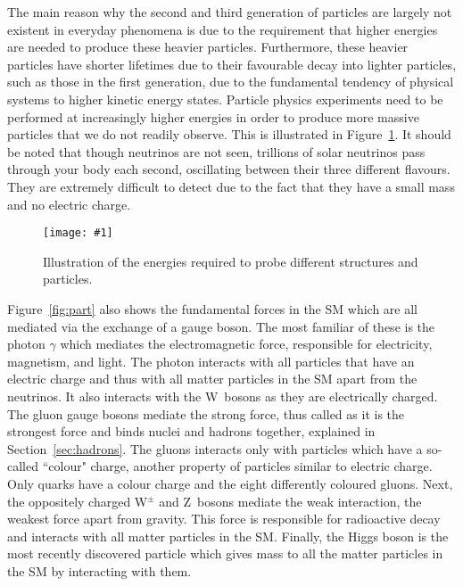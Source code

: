 \documentclass[twocolumn]{article}
\newcommand{\insertFigure}[1]{%
   \texttt{[image: \#1]}%
}
\begin{document}
The main reason why the second and third generation of particles are largely not existent in everyday phenomena is due to the requirement that higher energies are needed to produce these heavier particles. Furthermore, these heavier particles have shorter lifetimes due to their favourable decay into lighter particles, such as those in the first generation, due to the fundamental tendency of physical systems to higher kinetic energy states. Particle physics experiments need to be performed at increasingly higher energies in order to produce more massive particles that we do not readily observe. This is illustrated in Figure~\ref{fig:energy}. It should be noted that though neutrinos are not seen, trillions of solar neutrinos pass through your body each second, oscillating between their three different flavours.~\cite{Thompson} They are extremely difficult to detect due to the fact that they have a small mass and no electric charge. \\
\begin{figure}[!h]
	\centering
	\insertFigure{energy.png}
	\caption{Illustration of the energies required to probe different structures and particles.~\cite{Thompson}}
	\label{fig:energy}
\end{figure}
\par Figure~\ref{fig:part} also shows the fundamental forces in the SM which are all mediated via the exchange of a gauge boson. The most familiar of these is the photon $\gamma$ which mediates the electromagnetic force, responsible for electricity, magnetism, and light. The photon interacts with all particles that have an electric charge and thus with all matter particles in the SM apart from the neutrinos. It also interacts with the W~bosons as they are electrically charged. The gluon gauge bosons mediate the strong force, thus called as it is the strongest force and binds nuclei and hadrons together, explained in Section~\ref{sec:hadrons}. The gluons interacts only with particles which have a so-called ``colour" charge, another property of particles similar to electric charge. Only quarks have a colour charge and the eight differently coloured gluons. Next, the oppositely charged W$^{\pm}$ and Z~bosons mediate the weak interaction, the weakest force apart from gravity. This force is responsible for radioactive decay and interacts with all matter particles in the SM. Finally, the Higgs boson is the most recently discovered particle which gives mass to all the matter particles in the SM by interacting with them.
\end{document}
